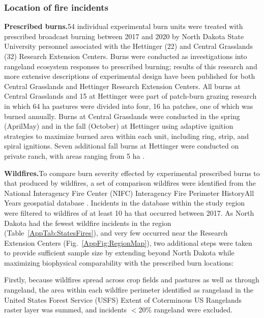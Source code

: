 \documentclass[fire,article,submit,oneauthor,pdftex]{Definitions/mdpi}
\begin{document}
\subsubsection{Location of fire incidents}

\textbf{Prescribed burns.\textemdash}54 individual experimental burn units were treated with prescribed broadcast burning between 2017 and 2020 by North Dakota State University personnel associated with the Hettinger (22) and Central Grasslands (32) Research Extension Centers. 
Burns were conducted as investigations into rangeland ecosystem responses to prescribed burning; results of this research and more extensive descriptions of experimental design have been published for both Central Grasslands \cite{duquette2022, wanchuk2024, mcgranahan2025a} and Hettinger \cite{spiess2024, spiess2025} Research Extension Centers. 
All burns at Central Grasslands and 15 at Hettinger were part of patch-burn grazing research in which 64 ha pastures were divided into four, 16 ha patches, one of which was burned annually. 
Burns at Central Grasslands were conducted in the spring (April\textendash May) and in the fall (October) at Hettinger using adaptive ignition strategies to maximize burned area within each unit, including ring, strip, and spiral ignitions. 
Seven additional fall burns at Hettinger were conducted on private ranch, with areas ranging from 5 ha \cite{mcgranahan2022}. 

\textbf{Wildfires.\textemdash}To compare burn severity effected by experimental prescribed burns to that produced by wildfires, a set of comparison wildfires were identified from the National Interagency Fire Center (NIFC) Interagency Fire Perimeter History\textemdash All Years geospatial database \cite{nifc2024}. 
Incidents in the database within the study region were filtered to wildfires of at least 10 ha that occurred between 2017. 
As North Dakota had the fewest wildfire incidents in the region (Table~\ref{AppTab:StatesFires}), and very few occurred near the Research Extension Centers (Fig.~\ref{AppFig:RegionMap}), two additional steps were taken to provide sufficient sample size by extending beyond North Dakota while maximizing biophysical comparability with the prescribed burn locations:
 
Firstly, because wildfires spread across crop fields and pastures as well as through rangeland, the area within each wildfire perimeter identified as rangeland in the United States Forest Service (USFS) Extent of Coterminous US Rangelands raster layer \cite{usdaforestservicenodate} was summed, and incidents $<$20\% rangeland were excluded. 
\end{document}
